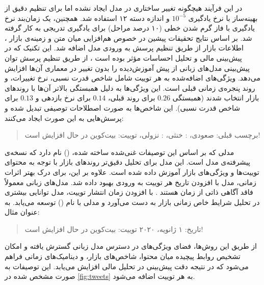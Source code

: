 در این فرآیند هیچگونه تغییر ساختاری در مدل ایجاد نشده اما برای تنظیم دقیق از بهینه‌ساز  با نرخ یادگیری $10^{-5}$ و اندازه دسته ۱۲ استفاده شد. همچنین، یک زمان‌بند نرخ یادگیری با فاز گرم شدن خطی (۱۰ درصد مراحل) برای یادگیری تدریجی به کار گرفته شد. بر اساس نتایج تحقیقات پیشین در خصوص هم‌افزایی میان متن و زمینه‌ی بازار \cite{man_2019_financial}، اطلاعات بازار از طریق تنظیم پرسش به ورودی مدل اضافه شد. این تکنیک که در پیش‌بینی مالی و تحلیل احساسات مؤثر بوده است \cite{leveraging_ahmed_2024}، از طریق تنظیم پرسش توان پیش‌بینی مدل‌های زبانی از پیش آموزش‌دیده را بدون تغییر در معماری آن‌ها افزایش می‌دهد. ویژگی‌های اضافه‌شده به هر توییت شامل شاخص قدرت نسبی، نرخ تغییرات، و روند پنجره‌ی زمانی قبلی است. این ویژگی‌ها به دلیل همبستگی بالاتر آن‌ها با روندهای بازار انتخاب شدند (همبستگی $0.26$ برای روند قبلی، $0.14$ برای نرخ بازدهی و $0.13$ برای شاخص قدرت نسبی). این شاخص‌ها به صورت اصطلاحات توصیفی تبدیل شده و پرسش‌هایی به این صورت ایجاد می‌کنند:
\begin{quote}
برچسب قبلی: صعودی، : خنثی، : نزولی، توییت: بیت‌کوین در حال افزایش است!
\end{quote}

مدلی که بر اساس این توصیفات غنی‌شده ساخته شده،  () نام دارد که نسخه‌ی پیشرفته‌ی مدل  است. این مدل برای تحلیل دقیق‌تر روندهای بازار با توجه به محتوای توییت‌ها و ویژگی‌های بازار آموزش داده شده است. علاوه بر این، برای درک بهتر اثرات زمانی، مدل با افزودن تاریخ هر توییت به ورودی بهبود داده شد. مدل‌های زبانی معمولاً فاقد آگاهی ذاتی از زمان هستند \cite{timeaware_dhingra_2021, temporal_agarwal_2021}. با افزودن زمان انتشار توییت، مدل توانایی بیشتری در تحلیل شرایط خاص زمانی بازار به دست می‌آورد و مدلی با نام  () توسعه می‌یابد. به عنوان مثال:
\begin{quote}
تاریخ: ۱ ژانویه، ۲۰۲۰ توییت: بیت‌کوین در حال افزایش است!
\end{quote}

از طریق این روش‌ها، فضای ویژگی‌های در دسترس مدل زبانی گسترش یافته و امکان تشخیص روابط پیچیده میان محتوا، شاخص‌های بازار، و دینامیک‌های زمانی فراهم می‌شود که در نتیجه دقت پیش‌بینی در تحلیل مالی افزایش می‌یابد.  این توصیفات به صورت مشخص شده در \ref{fig:tweets} به هر توییت اضافه می‌شود. 

